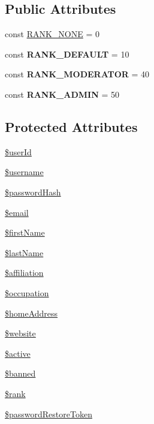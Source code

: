 \subsection*{Public Attributes}
\begin{DoxyCompactItemize}
\item 
const \hyperlink{classUser_ad4d2977f50b53b871bf059c570faf6d3}{RANK\_\-NONE} = 0
\item 
\hypertarget{classUser_abf235e3266be93f7b6fa230429e15ba6}{
const {\bfseries RANK\_\-DEFAULT} = 10}
\label{classUser_abf235e3266be93f7b6fa230429e15ba6}

\item 
\hypertarget{classUser_a8d3d400b5cb4c933963255e8799f39e1}{
const {\bfseries RANK\_\-MODERATOR} = 40}
\label{classUser_a8d3d400b5cb4c933963255e8799f39e1}

\item 
\hypertarget{classUser_ab96faeea11f461f03030b2f1b176d3a0}{
const {\bfseries RANK\_\-ADMIN} = 50}
\label{classUser_ab96faeea11f461f03030b2f1b176d3a0}

\end{DoxyCompactItemize}
\subsection*{Protected Attributes}
\begin{DoxyCompactItemize}
\item 
\hyperlink{classUser_abe744027963c3e398da9ad95316ace0d}{\$userId}
\item 
\hyperlink{classUser_ad22e19a56691cba5dc54ac38a91b79ff}{\$username}
\item 
\hyperlink{classUser_a329d5d877d90e34b99c969fd573c8f50}{\$passwordHash}
\item 
\hyperlink{classUser_a3bef7b70689d1e56cafbf750ff6a4aed}{\$email}
\item 
\hyperlink{classUser_ab4216ecb16d420f69cb32659a6744846}{\$firstName}
\item 
\hyperlink{classUser_a4f49336b16dc2612dae2069a078f4f14}{\$lastName}
\item 
\hyperlink{classUser_aea3a79f42359f935052c79cf9ad702f3}{\$affiliation}
\item 
\hyperlink{classUser_a434aa8daa7cab054eb51aa15546156b1}{\$occupation}
\item 
\hyperlink{classUser_a1588ee38de5c013009e557c4806178cf}{\$homeAddress}
\item 
\hyperlink{classUser_a9908094d21697133de85c18d68bb94f3}{\$website}
\item 
\hyperlink{classUser_a52a460018c232ef7b05baf89bb8fbfd7}{\$active}
\item 
\hyperlink{classUser_a80dcdcc86bf2441ac7f7c130da7e182e}{\$banned}
\item 
\hyperlink{classUser_ae9be7cedf59f3dda300308505cfd5948}{\$rank}
\item 
\hyperlink{classUser_a499d31c84301d5ff26c38906c74fab82}{\$passwordRestoreToken}
\end{DoxyCompactItemize}


